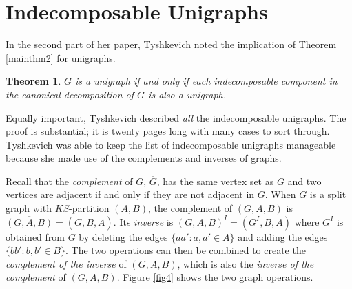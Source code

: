 \documentclass[11pt]{article}
\newtheorem{theorem}[df]{Theorem}
\begin{document}


\section{Indecomposable Unigraphs}
\label{sec3}

In the second part of her paper, Tyshkevich noted the implication of Theorem \ref{mainthm2} for unigraphs. 


\begin{theorem}{\bf \cite{Ty00}}
 $G$ is a unigraph if and only if each indecomposable component in the canonical decomposition of $G$ is also a unigraph.
 \label{thmcompose}
\end{theorem}



Equally  important, Tyshkevich described {\it all} the indecomposable unigraphs.  The proof is substantial; it is twenty pages long with many cases to sort through.  Tyshkevich was able to keep the list of indecomposable unigraphs manageable because she made use of the complements and inverses of graphs. 

  
  Recall that the  {\it complement} of $G$, $\overline{G}$, has the same vertex set as $G$ and two vertices are adjacent if and only if they are not adjacent in $G$. When $G$ is a split graph with $KS$-partition $(A,B)$,  the complement of $(G,A,B)$ is $\overline{(G,A,B)} = (\overline{G}, B, A)$. Its {\it inverse} is $(G,A,B)^I = (G^I, B, A)$ where $G^I$ is obtained from $G$ by deleting the edges $\{aa': a, a' \in A\}$ and adding the edges $\{bb': b, b' \in B\}$.  The two operations can then be combined to  create the {\it complement of the inverse} of $(G, A, B)$, which is also the {\it inverse of the complement} of $(G, A, B)$.  Figure \ref{fig4} shows the two graph operations.
\end{document}
